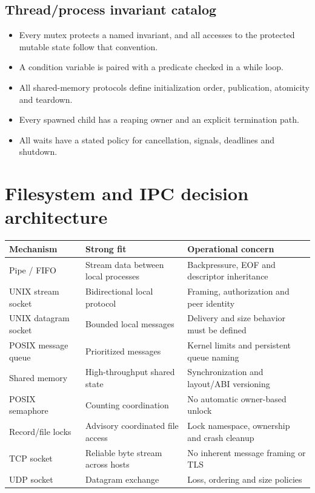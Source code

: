 \documentclass[11pt,letterpaper,oneside]{report}
\begin{document}
\section{Thread/process invariant catalog}
\begin{itemize}
\item Every mutex protects a named invariant, and all accesses to the protected mutable state follow that convention.
\item A condition variable is paired with a predicate checked in a while loop.
\item All shared-memory protocols define initialization order, publication, atomicity and teardown.
\item Every spawned child has a reaping owner and an explicit termination path.
\item All waits have a stated policy for cancellation, signals, deadlines and shutdown.
\end{itemize}
\chapter{Filesystem and IPC decision architecture}
\begin{longtable}{>{\raggedright\arraybackslash}p{.22\linewidth}>{\raggedright\arraybackslash}p{.32\linewidth}>{\raggedright\arraybackslash}p{.31\linewidth}}\toprule
Mechanism & Strong fit & Operational concern\\\midrule\endhead
Pipe / FIFO & Stream data between local processes & Backpressure, EOF and descriptor inheritance\\
UNIX stream socket & Bidirectional local protocol & Framing, authorization and peer identity\\
UNIX datagram socket & Bounded local messages & Delivery and size behavior must be defined\\
POSIX message queue & Prioritized messages & Kernel limits and persistent queue naming\\
Shared memory & High-throughput shared state & Synchronization and layout/ABI versioning\\
POSIX semaphore & Counting coordination & No automatic owner-based unlock\\
Record/file locks & Advisory coordinated file access & Lock namespace, ownership and crash cleanup\\
TCP socket & Reliable byte stream across hosts & No inherent message framing or TLS\\
UDP socket & Datagram exchange & Loss, ordering and size policies\\
\bottomrule\end{longtable}
\end{document}
